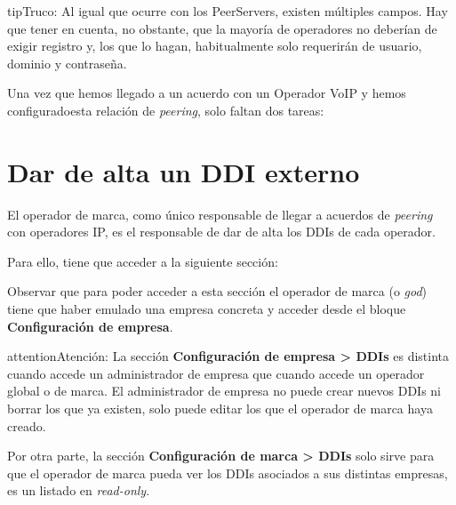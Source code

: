 \documentclass[letterpaper,10pt,spanish]{sphinxmanual}
\begin{document}
\begin{notice}{tip}{Truco:}
Al igual que ocurre con los PeerServers, existen múltiples campos. Hay que tener en cuenta, no obstante, que la mayoría de operadores no deberían de exigir registro y, los que lo hagan, habitualmente solo requerirán de usuario, dominio y contraseña.
\end{notice}

Una vez que hemos llegado a un acuerdo con un Operador VoIP y hemos configuradoesta relación de \emph{peering}, solo faltan dos tareas:


\section{Dar de alta un DDI externo}
\label{external_incoming_calls/configure_ddi:settingup-ddi}\label{external_incoming_calls/configure_ddi:configuring-an-external-ddi}\label{external_incoming_calls/configure_ddi::doc}
El operador de marca, como único responsable de llegar a acuerdos de \emph{peering} con operadores IP, es el responsable de dar de alta los DDIs de cada operador.

Para ello, tiene que acceder a la siguiente sección:


Observar que para poder acceder a esta sección el operador de marca (o \emph{god}) tiene que haber emulado una empresa concreta y acceder desde el bloque \textbf{Configuración de empresa}.

\begin{notice}{attention}{Atención:}
La sección \textbf{Configuración de empresa \textgreater{} DDIs} es distinta cuando accede un administrador de empresa que cuando accede un operador global o de marca. El administrador de empresa no puede crear nuevos DDIs ni borrar los que ya existen, solo puede editar los que el operador de marca haya creado.
\end{notice}

Por otra parte, la sección \textbf{Configuración de marca \textgreater{} DDIs} solo sirve para que el operador de marca pueda ver los DDIs asociados a sus distintas empresas, es un listado en \emph{read-only}.

\end{document}
